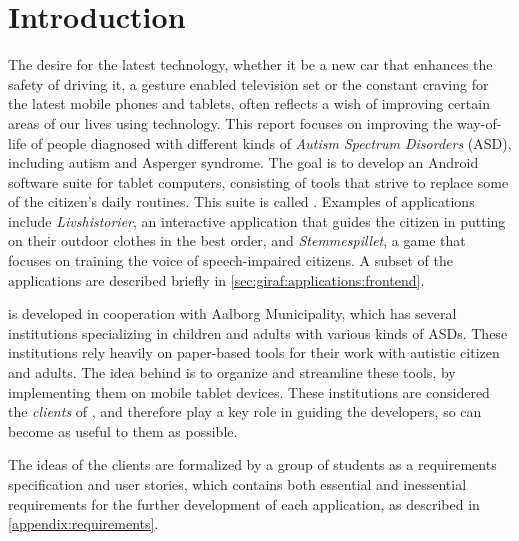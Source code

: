 \newcommand{\headerIntroduction}{Introduction}
\chapter*{\headerIntroduction}\label{chap:introduction}
\addcontentsline{toc}{chapter}{\headerIntroduction}

The desire for the latest technology, whether it be a new car that enhances the safety of driving it, a gesture enabled television set or the constant craving for the latest mobile phones and tablets, often reflects a wish of improving certain areas of our lives using technology.
This report focuses on improving the way-of-life of people diagnosed with different kinds of \textit{Autism Spectrum Disorders} (ASD), including autism and Asperger syndrome.
The goal is to develop an Android software suite for tablet computers, consisting of tools that strive to replace some of the citizen's daily routines. This suite is called \giraf.
Examples of \giraf applications include \textit{Livshistorier}, an interactive application that guides the citizen in putting on their outdoor clothes in the best order, and \textit{Stemmespillet}, a game that focuses on training the voice of speech-impaired citizens.
A subset of the \giraf applications are described briefly in \cref{sec:giraf:applications:frontend}.

\giraf is developed in cooperation with Aalborg Municipality, which has several institutions specializing in children and adults with various kinds of ASDs.
These institutions rely heavily on paper-based tools for their work with autistic citizen and adults. 
The idea behind \giraf is to organize and streamline these tools, by implementing them on mobile tablet devices.
These institutions are considered the \textit{clients} of \giraf, and therefore play a key role in guiding the developers, so \giraf can become as useful to them as possible.

The ideas of the clients are formalized by a group of students as a requirements specification and user stories, which contains both essential and inessential requirements for the further development of each application, as described in \cref{appendix:requirements}.